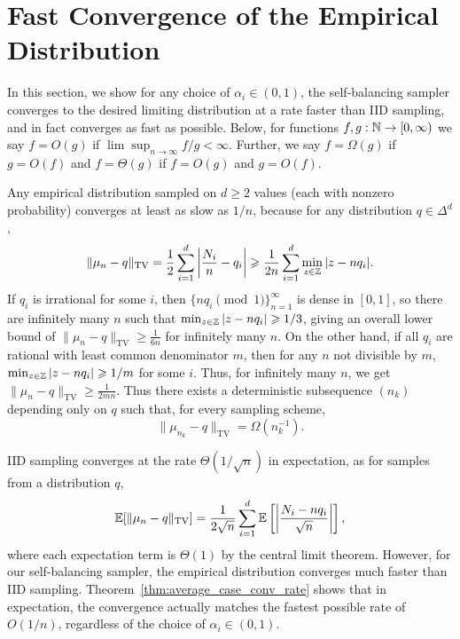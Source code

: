 \section{Fast Convergence of the Empirical Distribution}

\label{sec:convergence_rate}

In this section, we show for any choice of $\alpha_i \in (0,1)$, the self-balancing sampler converges to the desired limiting distribution at a rate faster than IID sampling, and in fact converges as fast as possible. Below, for functions $f,g:\mathbb{N} \to [0, \infty)$ we say $f = O(g)$ if $\lim\sup_{n\to \infty} f/g < \infty$. Further, we say $f = \Omega(g)$ if $g = O(f)$ and $f = \Theta(g)$ if $f = O(g)$ and $g = O(f)$.

Any empirical distribution sampled on $d \geq 2$ values (each with nonzero probability) converges at least as slow as $1/n$, because for any distribution $q \in \Delta^d$,
$$\| \mu_n - q\|_{\operatorname{TV}} = \frac{1}{2} \sum_{i=1}^d \left| \frac{N_i}{n} - q_i \right| \geqslant \frac{1}{2n}\sum_{i=1}^d \min_{z \in \mathbb{Z}} |z - nq_i|.$$
If $q_i$ is irrational for some $i$, then $\{n q_i \pmod 1\}_{n=1}^\infty$ is dense in $[0,1]$, so there are infinitely many $n$ such that $\min_{z \in \mathbb{Z}} |z - nq_i| \geqslant 1/3$, 
giving an overall lower bound of $\|  \mu_n - q\|_{\operatorname{TV}} \geq \frac{1}{6n}$ for infinitely many $n$. On the other hand, if all $q_i$ are rational
 with least common denominator $m$, then for any $n$ not divisible by $m$, $\min_{z \in \mathbb{Z}} |z - nq_i| \geqslant 1/m$ 
 for some $i$. Thus, for infinitely many $n$, we get $\| \mu_n - q\|_{\operatorname{TV}} \geq \frac{1}{2mn}$.
 Thus there exists a deterministic subsequence $(n_k)$ depending only on $q$ such that, for every sampling scheme,
 \[\|\mu_{n_k}-q\|_{\operatorname{TV}}=\Omega(n_k^{-1}).\]

IID sampling converges at the rate $\Theta(1/\sqrt n)$ in expectation, as for samples from a distribution $q$,
$$\mathbb{E}[\| \mu_n - q\|_{\operatorname{TV}}] = \frac{1}{2\sqrt n} \sum_{i=1}^d \mathbb{E} \left[\left|\frac{N_i - nq_i}{\sqrt n}\right|\right],$$
where each expectation term is $\Theta(1)$ by the central limit theorem. However, for our self-balancing sampler, the
empirical distribution converges much faster than IID sampling. Theorem~\ref{thm:average_case_conv_rate} shows that
 in expectation, the convergence actually matches the fastest possible rate of $O(1/n)$, regardless of the choice
 of $\alpha_i \in (0,1)$. 

